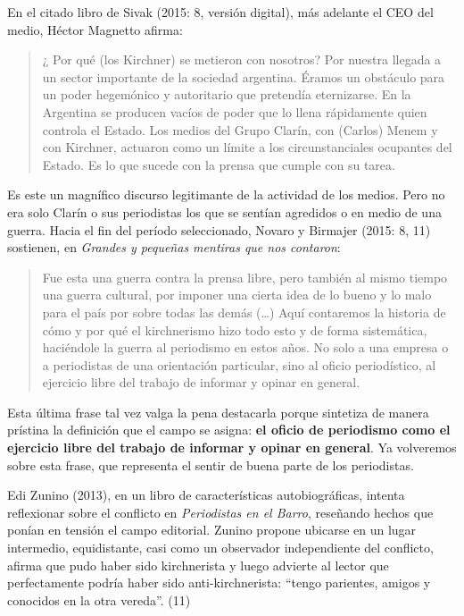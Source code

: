 En el citado libro de Sivak (2015: 8, versión digital), más adelante el CEO del medio, Héctor Magnetto afirma:

\begin{quote}
¿ Por qué (los Kirchner) se metieron con nosotros? Por nuestra llegada a un sector importante de la sociedad argentina. Éramos un obstáculo para un poder hegemónico y autoritario que pretendía eternizarse. En la Argentina se producen vacíos de poder que lo llena rápidamente quien controla el Estado. Los medios del Grupo Clarín, con (Carlos) Menem y con Kirchner, actuaron como un límite a los circunstanciales ocupantes del Estado. Es lo que sucede con la prensa que cumple con su tarea.
\end{quote}

Es este un magnífico discurso legitimante de la actividad de los medios. Pero no era solo Clarín o sus periodistas los que se sentían agredidos o en medio de una guerra. Hacia el fin del período seleccionado, Novaro y Birmajer (2015: 8, 11) sostienen, en \emph{Grandes y pequeñas mentiras que nos contaron}:

\begin{quote}
Fue esta una guerra contra la prensa libre, pero también al mismo tiempo una guerra cultural, por imponer una cierta idea de lo bueno y lo malo para el país por sobre todas las demás (\ldots) Aquí contaremos la historia de cómo y por qué el kirchnerismo hizo todo esto y de forma sistemática, haciéndole la guerra al periodismo en estos años. No solo a una empresa o a periodistas de una orientación particular, sino al oficio periodístico, al ejercicio libre del trabajo de informar y opinar en general.
\end{quote}

Esta última frase tal vez valga la pena destacarla porque sintetiza de manera prístina la definición que el campo se asigna: \textbf{el oficio de periodismo como el ejercicio libre del trabajo de informar y opinar en general}. Ya volveremos sobre esta frase, que representa el sentir de buena parte de los periodistas.

Edi Zunino (2013), en un libro de características autobiográficas, intenta reflexionar sobre el conflicto en \emph{Periodistas en el Barro}, reseñando hechos que ponían en tensión el campo editorial. Zunino propone ubicarse en un lugar intermedio, equidistante, casi como un observador independiente del conflicto, afirma que pudo haber sido kirchnerista y luego advierte al lector que perfectamente podría haber sido anti-kirchnerista: ``tengo parientes, amigos y conocidos en la otra vereda''. (11)

